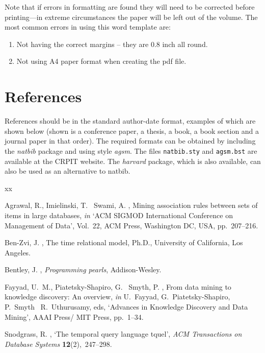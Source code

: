 \documentclass{CRPITStyle}
\begin{document}
Note that if errors in formatting are found they will need to be corrected before printing---in extreme circumstances the paper will be left out of the volume.  The most common errors in using this word template are:
\begin{enumerate}
\item Not having the correct margins -- they are 0.8 inch all round.
\item Not using A4 paper format when creating the pdf file.
\end{enumerate}

\section{References}
References should be in the standard author-date format, examples of which are shown below (shown is a conference paper, a thesis, a book, a book section and a journal paper in that order).  The required formats can be obtained by including the {\it natbib} package and using style {\it agsm}.  The files {\tt natbib.sty} and {\tt agsm.bst} are available at the CRPIT website.  The  {\it harvard} package, which is also available, can also be used as an alternative to natbib.



\begin{thebibliography}{xx}

Agrawal, R., Imielinski, T. \harvardand\ Swami, A.  \harvardyearleft
  1993\harvardyearright , Mining association rules between sets of items in
  large databases, {\em in} `ACM SIGMOD International Conference on Management
  of Data', Vol.~22, ACM Press, Washington DC, USA, pp.~207--216.

Ben-Zvi, J.  \harvardyearright , The time relational
  model, Ph.{D}., University of California, Los Angeles.

Bentley, J.  \harvardyearright , {\em Programming pearls},
  Addison-Wesley.

Fayyad, U.~M., Piatetsky-Shapiro, G. \harvardand\ Smyth, P.  \harvardyearleft
  1996\harvardyearright , From data mining to knowledge discovery: An overview,
  {\em in} U.~Fayyad, G.~Piatetsky-Shapiro, P.~Smyth \harvardand\
  R.~Uthurusamy, eds, `Advances in Knowledge Discovery and Data Mining', AAAI
  Press/ MIT Press, pp.~1--34.

\harvarditem{Snodgrass}{1987}{Snodgrass87}
Snodgrass, R.  \harvardyearright , `The temporal query
  language tquel', {\em ACM Transactions on Database Systems} {\bf
  12}(2),~247--298.

\end{thebibliography}
\end{document}
